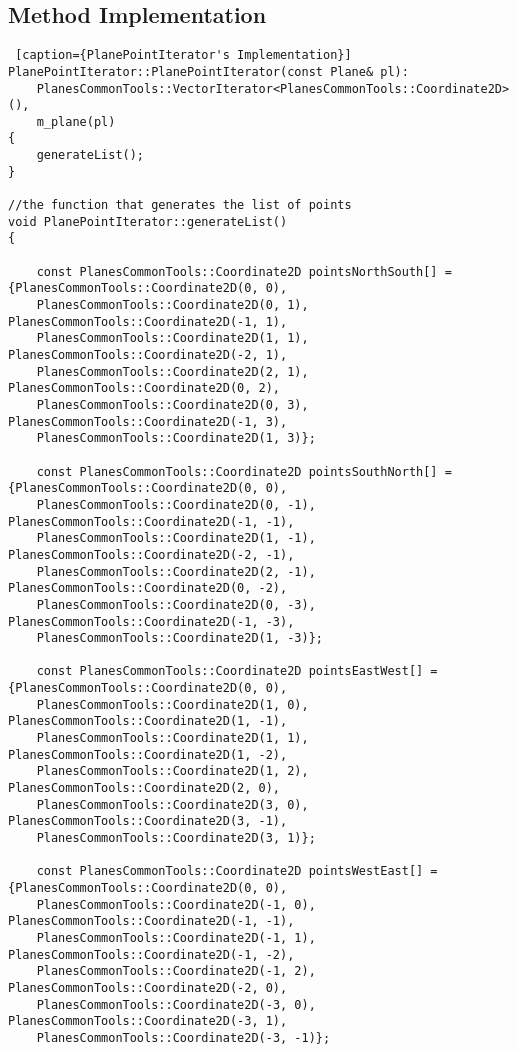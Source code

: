 \subsection {Method Implementation}
\begin{lstlisting} [caption={PlanePointIterator's Implementation}]
PlanePointIterator::PlanePointIterator(const Plane& pl):
    PlanesCommonTools::VectorIterator<PlanesCommonTools::Coordinate2D>(),
    m_plane(pl)
{
    generateList();
}

//the function that generates the list of points
void PlanePointIterator::generateList()
{

    const PlanesCommonTools::Coordinate2D pointsNorthSouth[] = {PlanesCommonTools::Coordinate2D(0, 0), 
    PlanesCommonTools::Coordinate2D(0, 1), PlanesCommonTools::Coordinate2D(-1, 1),
    PlanesCommonTools::Coordinate2D(1, 1), PlanesCommonTools::Coordinate2D(-2, 1), 
    PlanesCommonTools::Coordinate2D(2, 1), PlanesCommonTools::Coordinate2D(0, 2),
    PlanesCommonTools::Coordinate2D(0, 3), PlanesCommonTools::Coordinate2D(-1, 3),
    PlanesCommonTools::Coordinate2D(1, 3)};

    const PlanesCommonTools::Coordinate2D pointsSouthNorth[] = {PlanesCommonTools::Coordinate2D(0, 0), 
    PlanesCommonTools::Coordinate2D(0, -1), PlanesCommonTools::Coordinate2D(-1, -1),
    PlanesCommonTools::Coordinate2D(1, -1), PlanesCommonTools::Coordinate2D(-2, -1),
    PlanesCommonTools::Coordinate2D(2, -1), PlanesCommonTools::Coordinate2D(0, -2), 
    PlanesCommonTools::Coordinate2D(0, -3), PlanesCommonTools::Coordinate2D(-1, -3),
    PlanesCommonTools::Coordinate2D(1, -3)};

    const PlanesCommonTools::Coordinate2D pointsEastWest[] = {PlanesCommonTools::Coordinate2D(0, 0), 
    PlanesCommonTools::Coordinate2D(1, 0), PlanesCommonTools::Coordinate2D(1, -1),
    PlanesCommonTools::Coordinate2D(1, 1), PlanesCommonTools::Coordinate2D(1, -2), 
    PlanesCommonTools::Coordinate2D(1, 2), PlanesCommonTools::Coordinate2D(2, 0), 
    PlanesCommonTools::Coordinate2D(3, 0), PlanesCommonTools::Coordinate2D(3, -1),
    PlanesCommonTools::Coordinate2D(3, 1)};

    const PlanesCommonTools::Coordinate2D pointsWestEast[] = {PlanesCommonTools::Coordinate2D(0, 0), 
    PlanesCommonTools::Coordinate2D(-1, 0), PlanesCommonTools::Coordinate2D(-1, -1),
    PlanesCommonTools::Coordinate2D(-1, 1), PlanesCommonTools::Coordinate2D(-1, -2), 
    PlanesCommonTools::Coordinate2D(-1, 2), PlanesCommonTools::Coordinate2D(-2, 0), 
    PlanesCommonTools::Coordinate2D(-3, 0), PlanesCommonTools::Coordinate2D(-3, 1),
    PlanesCommonTools::Coordinate2D(-3, -1)};


\end{lstlisting}
